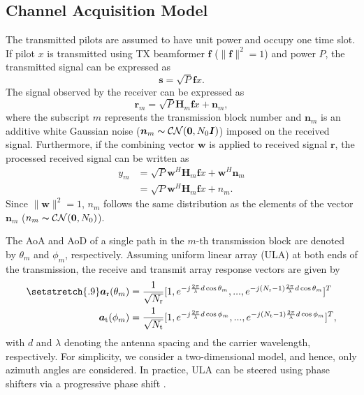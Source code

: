 \documentclass{ieeeaccess}
\begin{document}
\subsection{Channel Acquisition Model}
The transmitted pilots are assumed to have unit power and occupy one time slot. If pilot $x$ is transmitted using TX beamformer $\boldsymbol{f}$ ($\|\boldsymbol{f}\|^2 = 1$) and power $P$, the transmitted signal can be expressed as
\begin{equation} \label{n4}
\boldsymbol{s} = \sqrt{P}\boldsymbol{f}x.
\end{equation}
The signal observed by the receiver can be expressed as
\begin{equation} \label{n5}
\boldsymbol{r}_m = \sqrt{P}\boldsymbol{H}_m\boldsymbol{f}x + \boldsymbol{n}_m,
\end{equation}
where the subscript $m$ represents the transmission block number and $\boldsymbol{n}_m$ is an additive white Gaussian noise ($\boldsymbol{n}_m\thicksim \mathcal{C}\mathcal{N}(\boldsymbol{0},N_0\boldsymbol{I})$) imposed on the received signal.
Furthermore, if the combining vector $\boldsymbol{w}$ is applied to received signal $\boldsymbol{r}$, the processed received signal can be written as
\begin{align}
y_m &= \sqrt{P}\boldsymbol{w}^H\boldsymbol{H}_m\boldsymbol{f}x + \boldsymbol{w}^H\boldsymbol{n}_m\nonumber\\
&= \sqrt{P}\boldsymbol{w}^H\boldsymbol{H}_m\boldsymbol{f}x + n_m. \label{n7}
\end{align}
Since $\|\boldsymbol{w}\|^2 = 1$, $n_m$ follows the same distribution as the elements of the vector $\boldsymbol{n}_m$ ($n_m\thicksim \mathcal{C}\mathcal{N}(\boldsymbol{0},N_0)$).


The AoA and AoD of a single path in the $m$-th transmission block are denoted by $\theta_m$ and $\phi_m$, respectively. Assuming uniform linear array (ULA) at both ends of the transmission, the receive and transmit array response vectors are given by
\begin{align}\label{n1}
\setstretch{.9}
\boldsymbol{a}_\textrm{r}(\theta_m) &= \frac{1}{\sqrt{N_\textrm{r}}}[1,e^{-j\frac{2\pi}{\lambda}d\cos\theta_m},...,e^{-j(N_\textrm{r}-1)\frac{2\pi}{\lambda}d\cos\theta_m}]^T\\
\boldsymbol{a}_\textrm{t}(\phi_m) &= \frac{1}{\sqrt{N_\textrm{t}}}[1,e^{-j\frac{2\pi}{\lambda}d\cos\phi_m},...,e^{-j(N_\textrm{t}-1)\frac{2\pi}{\lambda}d\cos\phi_m}]^T,\label{m1}
\end{align}
with $d$ and $\lambda$ denoting the antenna spacing and the carrier wavelength, respectively. For simplicity, we consider a two-dimensional model, and hence, only azimuth angles are considered. In practice, ULA can be steered using phase shifters via a progressive phase shift \cite{r6}.
\end{document}
